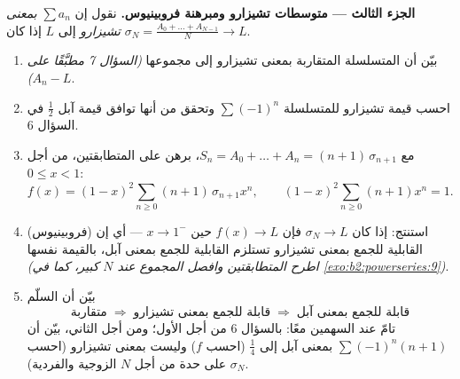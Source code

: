 \begin{problem}
\medskip
\noindent\textbf{الجزء الثالث --- متوسطات تشيزارو ومبرهنة
فروبينيوس.} نقول إن $\sum a_n$ \emph{ بمعنى تشيزارو} إلى $L$ إذا كان
$\sigma_N = \frac{A_0 + \dots + A_{N-1}}{N} \to L$.
\begin{enumerate}[resume]
  \item بيّن أن المتسلسلة المتقاربة  بمعنى تشيزارو إلى
        مجموعها \emph{(السؤال 7 مطبَّقًا على $A_n - L$)}.
  \item احسب قيمة تشيزارو للمتسلسلة $\sum(-1)^n$ وتحقق من أنها
        توافق قيمة آبل $\frac12$ في السؤال 6.
  \item مع $S_n = A_0 + \dots + A_n = (n+1)\,\sigma_{n+1}$،
        برهن على المتطابقتين، من أجل $0 \leq x < 1$:
        \[
        f(x) = (1-x)^2\sum_{n\geq0}(n+1)\,\sigma_{n+1}x^n,
        \qquad
        (1-x)^2\sum_{n\geq0}(n+1)x^n = 1 .
        \]
  \item (فروبينيوس) استنتج: إذا كان $\sigma_N \to L$ فإن $f(x) \to
        L$ حين $x \to 1^-$ --- أي إن القابلية للجمع بمعنى تشيزارو تستلزم
        القابلية للجمع بمعنى آبل، بالقيمة نفسها \emph{(اطرح
        المتطابقتين وافصل المجموع عند $N$ كبير، كما في
        \cref{exo:b2:powerseries:9})}.
  \item بيّن أن السلّم
        \[
        \text{متقاربة} \;\Longrightarrow\;
        \text{قابلة للجمع بمعنى تشيزارو} \;\Longrightarrow\;
        \text{قابلة للجمع بمعنى آبل}
        \]
        تامّ عند السهمين معًا: بالسؤال 6 من أجل الأول؛
        ومن أجل الثاني، بيّن أن $\sum(-1)^n(n+1)$
         بمعنى آبل إلى $\frac14$ (احسب $f$) وليست
         بمعنى تشيزارو (احسب $\sigma_N$ على حدة من أجل
        $N$ الزوجية والفردية).
\end{enumerate}


\end{problem}
